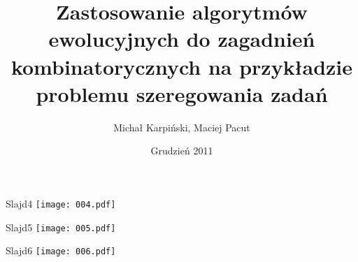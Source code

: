 \documentclass{beamer}
\title{Zastosowanie algorytmów ewolucyjnych do zagadnień kombinatorycznych na przykładzie problemu szeregowania zadań}
\author{Michał Karpiński, Maciej Pacut}
\date{Grudzień 2011}
\begin{document}
\maketitle
 
\begin{frame}{Slajd4}
  \texttt{[image: 004.pdf]}
\end{frame}

\begin{frame}{Slajd5}
  \texttt{[image: 005.pdf]}
\end{frame}

\begin{frame}{Slajd6}
  \texttt{[image: 006.pdf]}
\end{frame}
\end{document}
